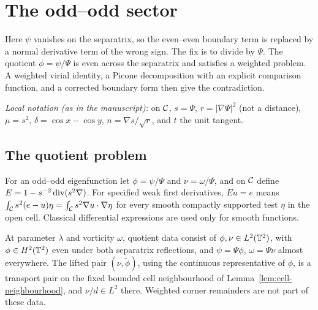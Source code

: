 \chapter{The odd--odd sector}
\label{chap:odd-odd}

Here $\psi$ vanishes on the separatrix, so the even--even boundary term is
replaced by a normal derivative term of the wrong sign. The fix is to divide
by $\Psi$. The quotient $\phi=\psi/\Psi$ is even across the separatrix and
satisfies a weighted problem. A weighted virial identity, a Picone
decomposition with an explicit comparison function, and a corrected
boundary form then give the contradiction.

\emph{Local notation (as in the manuscript):} on $\mathcal{C}$, $s=\Psi$,
$r=|\nabla\Psi|^2$ (not a distance), $\mu=s^2$, $\delta=\cos x-\cos y$,
$n=\nabla s/\sqrt r$, and $t$ the unit tangent.

\section{The quotient problem}

\begin{definition}
\label{def:dd-quotient}
\leanok
For an odd--odd eigenfunction let $\phi=\psi/\Psi$ and $\nu=\omega/\Psi$, and
on $\mathcal{C}$ define $E=1-s^{-2}\operatorname{div}(s^2\nabla)$.
For specified weak first derivatives, $Eu=e$ means
$\int_{\mathcal{C}} s^2(e-u)\eta=\int_{\mathcal{C}} s^2\nabla u\cdot\nabla\eta$
for every smooth compactly supported test $\eta$ in the open cell.
Classical differential expressions are used only for smooth functions.
\end{definition}

\begin{definition}
\label{def:dd-exclusion-domain}
\leanok
At parameter $\lambda$ and vorticity $\omega$, quotient data consist of
$\phi,\nu\in L^2(\mathbb{T}^2)$, with $\phi\in H^2(\mathbb{T}^2)$ even under both
separatrix reflections, and $\psi=\Psi\phi$, $\omega=\Psi\nu$ almost
everywhere. The lifted pair $(\nu,\widetilde\phi)$, using the continuous
representative of $\phi$, is a transport pair on the fixed bounded cell
neighbourhood of Lemma~\ref{lem:cell-neighbourhood}, and $\nu/d\in L^2$
there. Weighted corner remainders are not part of these data.
\end{definition}

